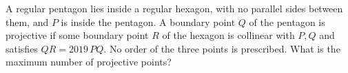 A regular pentagon lies inside a regular hexagon, with no parallel sides between them, and $P$ is inside the pentagon. A boundary point $Q$ of the pentagon is projective if some boundary point $R$ of the hexagon is collinear with $P,Q$ and satisfies $QR=2019\,PQ$. No order of the three points is prescribed. What is the maximum number of projective points?
